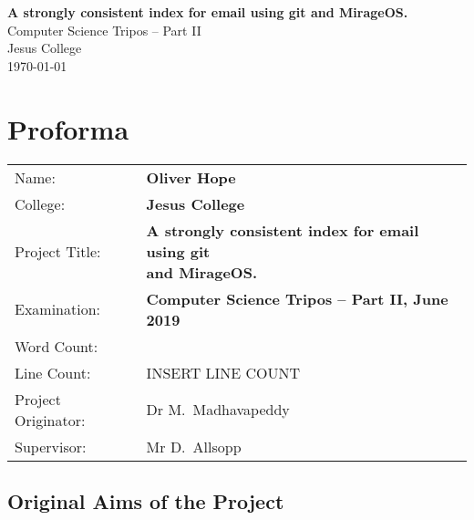 \documentclass[12pt,a4paper,twoside,openright]{report}
\begin{document}

\pagestyle{empty}


\vspace*{60mm}
\begin{center}
\Huge
\textbf{A strongly consistent index for email using git and MirageOS.} \\[5mm]
Computer Science Tripos -- Part II \\[5mm]
Jesus College \\[5mm]
\today  %
\end{center}


\pagestyle{plain}

\chapter*{Proforma}

\begin{adjustbox}{width={\textwidth},totalheight={\textheight},keepaspectratio}%
{\large
\begin{tabular}{ll}
Name:               & \bf Oliver Hope \\
College:            & \bf Jesus College \\
Project Title:      & \makecell[l]{\bf A strongly consistent index for email using git \\ \bf and MirageOS.} \\
Examination:        & \bf Computer Science Tripos -- Part II, June 2019 \\
Word Count:         & \bf \footnotemark[1] \\
Line Count:         & INSERT LINE COUNT \\
Project Originator: & Dr M.~Madhavapeddy \\
Supervisor:         & Mr D.~Allsopp \\
\end{tabular}
}
\end{adjustbox}


\section*{Original Aims of the Project}
\end{document}
